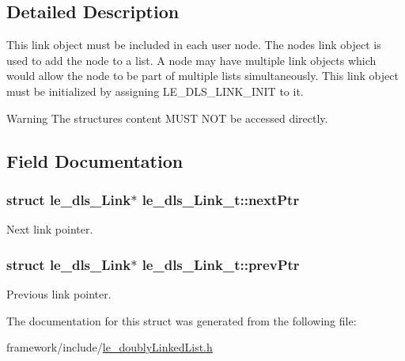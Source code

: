 \subsection{Detailed Description}
This link object must be included in each user node. The node\textquotesingle{}s link object is used to add the node to a list. A node may have multiple link objects which would allow the node to be part of multiple lists simultaneously. This link object must be initialized by assigning L\+E\+\_\+\+D\+L\+S\+\_\+\+L\+I\+N\+K\+\_\+\+I\+N\+IT to it.

\begin{DoxyWarning}{Warning}
The structure\textquotesingle{}s content M\+U\+ST N\+OT be accessed directly. 
\end{DoxyWarning}


\subsection{Field Documentation}
\subsubsection[{\texorpdfstring{next\+Ptr}{nextPtr}}]{\setlength{\rightskip}{0pt plus 5cm}struct le\+\_\+dls\+\_\+\+Link$\ast$ le\+\_\+dls\+\_\+\+Link\+\_\+t\+::next\+Ptr}\hypertarget{structle__dls___link__t_aeb5c99f0b4fb15daefef9b81f04b98dc}{}\label{structle__dls___link__t_aeb5c99f0b4fb15daefef9b81f04b98dc}


Next link pointer. 

\subsubsection[{\texorpdfstring{prev\+Ptr}{prevPtr}}]{\setlength{\rightskip}{0pt plus 5cm}struct le\+\_\+dls\+\_\+\+Link$\ast$ le\+\_\+dls\+\_\+\+Link\+\_\+t\+::prev\+Ptr}\hypertarget{structle__dls___link__t_acf978c7d31cf7ab2aa0f7b36603f4a12}{}\label{structle__dls___link__t_acf978c7d31cf7ab2aa0f7b36603f4a12}


Previous link pointer. 



The documentation for this struct was generated from the following file\+:\begin{DoxyCompactItemize}
\item 
framework/include/\hyperlink{le__doubly_linked_list_8h}{le\+\_\+doubly\+Linked\+List.\+h}\end{DoxyCompactItemize}
